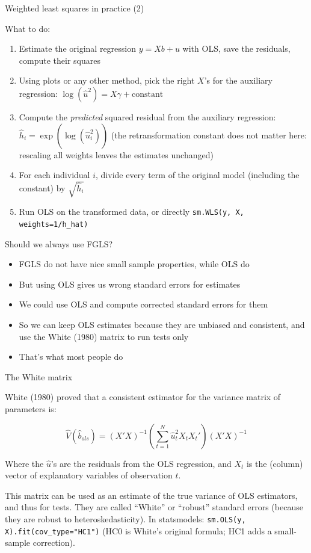 \documentclass[aspectratio=169]{beamer}
\begin{document}
\begin{frame}{Weighted least squares in practice (2)}

What to do:

\begin{enumerate}
    \item Estimate the original regression $y = Xb + u$ with OLS, save the residuals, compute their squares
    \item Using plots or any other method, pick the right $X$'s for the auxiliary regression: $\log(\hat{u}^2) = X\gamma + \text{constant}$
    \item Compute the \textit{predicted} squared residual from the auxiliary regression: $\hat{h}_i = \exp(\widehat{\log(\hat{u}_i^2)})$ (the retransformation constant does not matter here: rescaling all weights leaves the estimates unchanged)
    \item For each individual $i$, divide every term of the original model (including the constant) by $\sqrt{\hat{h}_i}$
    \item Run OLS on the transformed data, or directly \texttt{sm.WLS(y, X, weights=1/h\_hat)}
\end{enumerate}

\end{frame}

\begin{frame}{Should we always use FGLS?}

\begin{itemize}
    \item FGLS do not have nice small sample properties, while OLS do
    \item But using OLS gives us wrong standard errors for estimates
    \item We could use OLS and compute corrected standard errors for them
    \item So we can keep OLS estimates because they are unbiased and consistent, and use the White (1980) matrix to run tests only
    \item That's what most people do
\end{itemize}

\end{frame}

\begin{frame}{The White matrix}

White (1980) proved that a consistent estimator for the variance matrix of parameters is:

\[
\hat{V}(\hat{b}_{ols}) = (X'X)^{-1}\left(\sum_{t=1}^{N} \hat{u}_t^2 X_t X_t'\right)(X'X)^{-1}
\]

Where the $\hat{u}$'s are the residuals from the OLS regression, and $X_t$ is the (column) vector of explanatory variables of observation $t$.

This matrix can be used as an estimate of the true variance of OLS estimators, and thus for tests. They are called ``White'' or ``robust'' standard errors (because they are robust to heteroskedasticity). In statsmodels: \texttt{sm.OLS(y, X).fit(cov\_type="HC1")} (HC0 is White's original formula; HC1 adds a small-sample correction).

\end{frame}
\end{document}
